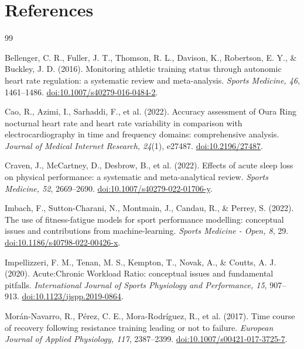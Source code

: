 \documentclass[11pt]{article}
\begin{document}
\section{References}

\begin{thebibliography}{99}

Bellenger, C. R., Fuller, J. T., Thomson, R. L., Davison, K., Robertson, E. Y., \& Buckley, J. D. (2016).
Monitoring athletic training status through autonomic heart rate regulation: a systematic review and meta-analysis.
\emph{Sports Medicine, 46}, 1461--1486.
\href{https://doi.org/10.1007/s40279-016-0484-2}{doi:10.1007/s40279-016-0484-2}.

Cao, R., Azimi, I., Sarhaddi, F., et al. (2022).
Accuracy assessment of Oura Ring nocturnal heart rate and heart rate variability in comparison with electrocardiography in time and frequency domains: comprehensive analysis.
\emph{Journal of Medical Internet Research, 24}(1), e27487.
\href{https://doi.org/10.2196/27487}{doi:10.2196/27487}.

Craven, J., McCartney, D., Desbrow, B., et al. (2022).
Effects of acute sleep loss on physical performance: a systematic and meta-analytical review.
\emph{Sports Medicine, 52}, 2669--2690.
\href{https://doi.org/10.1007/s40279-022-01706-y}{doi:10.1007/s40279-022-01706-y}.

Imbach, F., Sutton-Charani, N., Montmain, J., Candau, R., \& Perrey, S. (2022).
The use of fitness-fatigue models for sport performance modelling: conceptual issues and contributions from machine-learning.
\emph{Sports Medicine - Open, 8}, 29.
\href{https://doi.org/10.1186/s40798-022-00426-x}{doi:10.1186/s40798-022-00426-x}.

Impellizzeri, F. M., Tenan, M. S., Kempton, T., Novak, A., \& Coutts, A. J. (2020).
Acute:Chronic Workload Ratio: conceptual issues and fundamental pitfalls.
\emph{International Journal of Sports Physiology and Performance, 15}, 907--913.
\href{https://doi.org/10.1123/ijspp.2019-0864}{doi:10.1123/ijspp.2019-0864}.

Mor\'an-Navarro, R., P\'erez, C. E., Mora-Rodr\'iguez, R., et al. (2017).
Time course of recovery following resistance training leading or not to failure.
\emph{European Journal of Applied Physiology, 117}, 2387--2399.
\href{https://doi.org/10.1007/s00421-017-3725-7}{doi:10.1007/s00421-017-3725-7}.


\end{thebibliography}
\end{document}
